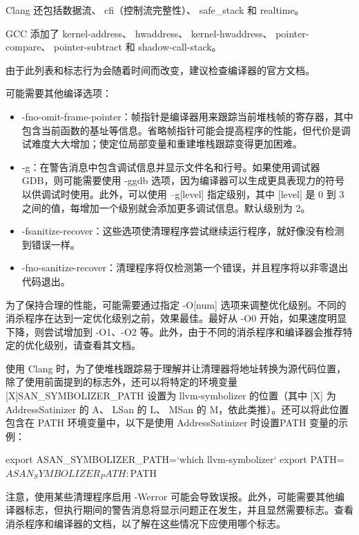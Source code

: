 Clang 还包括数据流、 cfi（控制流完整性）、 safe\_stack 和 realtime。

GCC 添加了 kernel-address、 hwaddress、 kernel-hwaddress、 pointer-compare、 pointer-subtract 和 shadow-call-stack。

由于此列表和标志行为会随着时间而改变，建议检查编译器的官方文档。

可能需要其他编译选项：

\begin{itemize}
\item
-fno-omit-frame-pointer：帧指针是编译器用来跟踪当前堆栈帧的寄存器，其中包含当前函数的基址等信息。省略帧指针可能会提高程序的性能，但代价是调试难度大大增加；使定位局部变量和重建堆栈跟踪变得更加困难。

\item
-g：在警告消息中包含调试信息并显示文件名和行号。如果使用调试器 GDB，则可能需要使用 -ggdb 选项，因为编译器可以生成更具表现力的符号以供调试时使用。此外，可以使用 –g[level] 指定级别，其中 [level] 是 0 到 3 之间的值，每增加一个级别就会添加更多调试信息。默认级别为 2。

\item
-fsanitize-recover：这些选项使清理程序尝试继续运行程序，就好像没有检测到错误一样。

\item
-fno-sanitize-recover：清理程序将仅检测第一个错误，并且程序将以非零退出代码退出。
\end{itemize}

为了保持合理的性能，可能需要通过指定 -O[num] 选项来调整优化级别。不同的消杀程序在达到一定优化级别之前，效果最佳。最好从 -O0 开始，如果速度明显下降，则尝试增加到 -O1、-O2 等。此外，由于不同的消杀程序和编译器会推荐特定的优化级别，请查看其文档。

使用 Clang 时，为了使堆栈跟踪易于理解并让清理器将地址转换为源代码位置，除了使用前面提到的标志外，还可以将特定的环境变量 [X]SAN\_SYMBOLIZER\_PATH 设置为 llvm-symbolizer 的位置（其中 [X] 为 AddressSatinizer 的 A、 LSan 的 L、 MSan 的 M，依此类推）。还可以将此位置包含在 PATH 环境变量中，以下是使用 AddressSatinizer 时设置PATH 变量的示例：

\begin{shell}
export ASAN_SYMBOLIZER_PATH=`which llvm-symbolizer`
export PATH=$ASAN_SYMBOLIZER_PATH:$PATH
\end{shell}

注意，使用某些清理程序启用 -Werror 可能会导致误报。此外，可能需要其他编译器标志，但执行期间的警告消息将显示问题正在发生，并且显然需要标志。查看消杀程序和编译器的文档，以了解在这些情况下应使用哪个标志。

